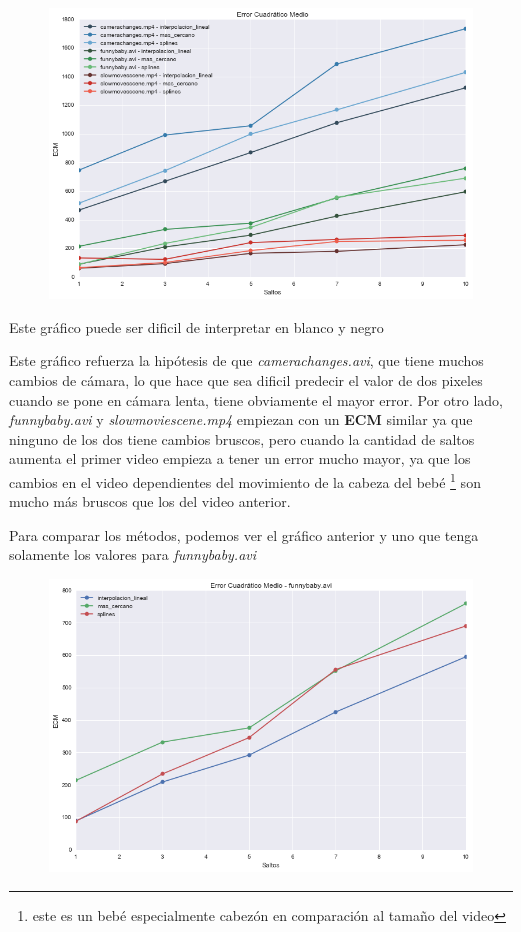 \begin{figure}[H]
\centering
\includegraphics[width=.95\textwidth]{graficos/ecm.png}
\end{figure}

\vspace{-2em}
\begin{tiny}Este gr\'afico puede ser dificil de interpretar en blanco y negro\end{tiny}
\vspace{2em}

Este gr\'afico refuerza la hip\'otesis de que \textit{camerachanges.avi}, que tiene
muchos cambios de c\'amara, lo que hace que sea dificil predecir el valor de dos
pixeles cuando se pone en c\'amara lenta, tiene obviamente el mayor error. Por
otro lado, \textit{funnybaby.avi} y \textit{slowmoviescene.mp4} empiezan con un
\textbf{ECM} similar ya que ninguno de los dos tiene cambios bruscos, pero
cuando la cantidad de saltos aumenta el primer video empieza a tener un error
mucho mayor, ya que los cambios en el video dependientes del movimiento de la
cabeza del beb\'e \footnote{este es un beb\'e especialmente cabez\'on en comparaci\'on al
tama\~no del video} son mucho m\'as bruscos que los del video anterior.

Para comparar los m\'etodos, podemos ver el gr\'afico anterior y uno que tenga
solamente los valores para \textit{funnybaby.avi}

\begin{figure}[H]
\centering
\includegraphics[width=.95\textwidth]{graficos/ecm_funnybaby.png}
\end{figure}


